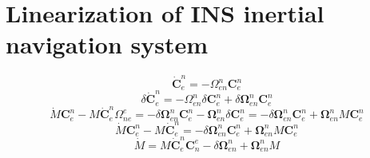 \section{Linearization of INS inertial navigation system}
\[
    \bm{\dot{C}}_e^n = -\Omega_{en}^n \bm{C}_e^n
\]
\[
    \delta\bm{\dot{C}}_e^n = -\Omega_{en}^n \delta\bm{C}_e^n + \delta\bm{\Omega}_{en}^n \bm{C}_e^n
\]
\[
\dot{M}\bm{C}_e^n - M\bm{\dot{C}}_e^n \Omega_{ne}^e = -\delta\bm{\Omega}_{en}^n \bm{C}_e^n - \bm{\Omega}_{en}^n \delta\bm{C}_e^n = -\delta\bm{\Omega}_{en}^n \bm{C}_e^n + \bm{\Omega}_{en}^n M \bm{C}_e^n 
\]
\[
    \dot{M} \bm{C}_e^n - M \bm{\dot{C}}_e^n = -\delta\bm{\Omega}_{en}^n \bm{C}_e^n 
     + \bm{\Omega}_{en}^n M \bm{C}_e^n
\]
\[
\dot{M} = M \bm{\dot{C}}_e^n \bm{C}_n^e - \delta{\bm{\Omega}}_{en}^n + \bm{\Omega}_{en}^n M
\]